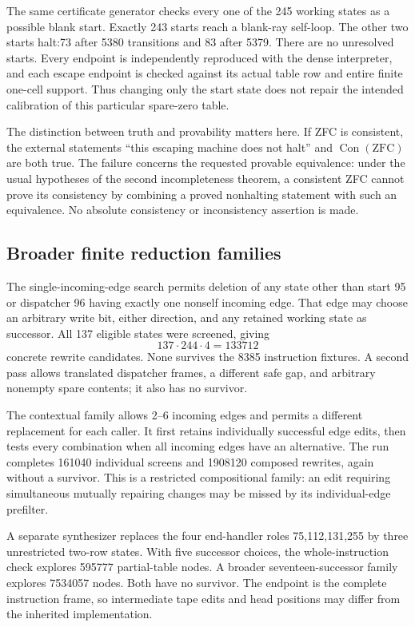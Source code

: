 The same certificate generator checks every one of the 245 working states
as a possible blank start. Exactly 243 starts reach a blank-ray self-loop.
The other two starts halt:73 after 5380 transitions and 83 after 5379. There
are no unresolved starts. Every endpoint is independently reproduced with
the dense interpreter, and each escape endpoint is checked against its
actual table row and entire finite one-cell support. Thus changing only the
start state does not repair the intended calibration of this particular
spare-zero table.

The distinction between truth and provability matters here. If ZFC is
consistent, the external statements ``this escaping machine does not halt''
and $\operatorname{Con}(\mathrm{ZFC})$ are both true. The failure concerns
the requested provable equivalence: under the usual hypotheses of the
second incompleteness theorem, a consistent ZFC cannot prove its consistency
by combining a proved nonhalting statement with such an equivalence. No
absolute consistency or inconsistency assertion is made.

\subsection{Broader finite reduction families}

The single-incoming-edge search permits deletion of any state other than
start 95 or dispatcher 96 having exactly one nonself incoming edge. That edge
may choose an arbitrary write bit, either direction, and any retained working
state as successor. All 137 eligible states were screened, giving
\[
 137\cdot 244\cdot 4=133712
\]
concrete rewrite candidates. None survives the 8385 instruction fixtures.
A second pass allows translated dispatcher frames, a different safe gap,
and arbitrary nonempty spare contents; it also has no survivor.

The contextual family allows 2--6 incoming edges and permits a different
replacement for each caller. It first retains individually successful edge
edits, then tests every combination when all incoming edges have an
alternative. The run completes 161040 individual screens and 1908120
composed rewrites, again without a survivor. This is a restricted
compositional family: an edit requiring simultaneous mutually repairing
changes may be missed by its individual-edge prefilter.

A separate synthesizer replaces the four end-handler roles 75,112,131,255
by three unrestricted two-row states. With five successor choices, the
whole-instruction check explores 595777 partial-table nodes. A broader
seventeen-successor family explores 7534057 nodes. Both have no survivor.
The endpoint is the complete instruction frame, so intermediate tape edits
and head positions may differ from the inherited implementation.


